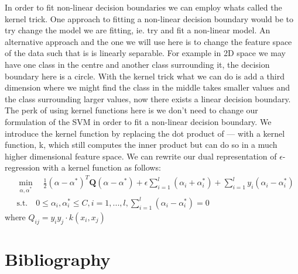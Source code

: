 \documentclass[11pt]{article}
\theoremstyle{definition}
\begin{document}
In order to fit non-linear decision boundaries we can employ whats called the kernel trick. One approach to fitting a non-linear decision boundary would be to try change the model we are fitting, ie. try and fit a non-linear model. An alternative approach and the one we will use here is to change the feature space of the data such that is is linearly separable. For example in 2D space we may have one class in the centre and another class surrounding it, the decision boundary here is a circle. With the kernel trick what we can do is add a third dimension where we might find the class in the middle takes smaller values and the class surrounding larger values, now there exists a linear decision boundary. The perk of using kernel functions here is we don't need to change our formulation of the SVM in order to fit a non-linear decision boundary. We introduce the kernel function by replacing the dot product of --- with a kernel function, k, which still computes the inner product but can do so in a much higher dimensional feature space. We can rewrite our dual representation of $\epsilon$-regression with a kernel function as follows:
\begin{align}
    &{} \min_{\alpha, \alpha^{*}} \quad \frac{1}{2} (\alpha - \alpha^{*})^{T} \mathbf{Q} (\alpha - \alpha^{*}) + \epsilon \sum_{i=1}^{l} (\alpha_{i} + \alpha_{i}^{*}) + \sum_{i=1}^{l} y_{i} (\alpha_{i} - \alpha_{i}^{*}) \\
    & \text{s.t.} \quad 0 \leq \alpha_{i}, \alpha_{i}^{*} \leq C, i=1,...,l, \sum_{i=1}^{l} (\alpha_{i} - \alpha_{i}^{*}) = 0
\end{align}
where $Q_{ij} = y_{i}  y_{j}  \cdot k(x_{i}, x_{j})$




\newpage


\newpage


\section{Bibliography}
\printbibliography
\end{document}
